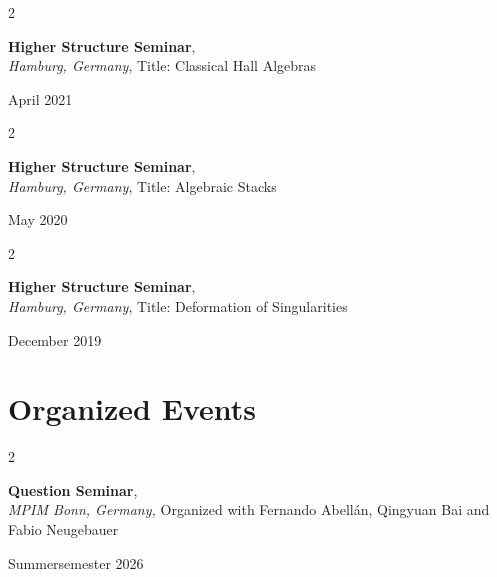 \documentclass[10pt, letterpaper]{article}
\newenvironment{twocolentry}[2][]{
    \onecolentry
    \def\secondColumn{#2}
    \setcolumnwidth{\fill, 4.5 cm}
    \begin{paracol}{2}
}{
    \switchcolumn \raggedleft \secondColumn
    \end{paracol}
    \endonecolentry
} %
\begin{document}
  \begin{twocolentry}{

    April 2021
           
        }
            \textbf{Higher Structure Seminar}, \\
            \textit{Hamburg, Germany},  Title: Classical Hall Algebras
            
           
        \end{twocolentry}
        
 \vspace{0.2cm}

 \begin{twocolentry}{

    May 2020
           
        }
            \textbf{Higher Structure Seminar}, \\
            \textit{Hamburg, Germany},  Title: Algebraic Stacks
            
           
        \end{twocolentry}
        
 \vspace{0.2cm}

  \begin{twocolentry}{

    December 2019
           
        }
            \textbf{Higher Structure Seminar}, \\
            \textit{Hamburg, Germany},  Title: Deformation of Singularities 
            
           
        \end{twocolentry}
        
 \vspace{0.2cm}

\section{Organized Events}


\begin{twocolentry}{

    Summersemester 2026
           
        }
            \textbf{Question Seminar}, \\
            \textit{MPIM Bonn, Germany,} Organized with Fernando Abell\'{a}n, Qingyuan Bai and Fabio Neugebauer
            
           
        \end{twocolentry}
        
\end{document}
